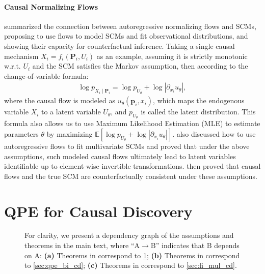 \documentclass{article}
\theoremstyle{plain}
\theoremstyle{definition}
\theoremstyle{remark}
\newcommand{\tikzbox}[2][black]{
    \tikz[baseline=-0.6ex]{
        \node[
            draw=#1,
            fill=#2,
            minimum size=1.5ex,
            inner sep=0pt,
        ] {};
    }%
}
\begin{document}
\paragraph{Causal Normalizing Flows}
\label{ssec:causal_flow}
\citet{Javaloy2023} summarized the connection between autoregressive normalizing flows and SCMs, proposing to use flows to model SCMs and fit observational distributions, and showing their capacity for counterfactual inference. Taking a single causal mechanism $X_i=f_i(\bm{P}_i,U_i)$ as an example, assuming it is strictly monotonic w.r.t. $U_i$ and the SCM satisfies the Markov assumption, then according to the change-of-variable formula:
\begin{align}
\label{eq:cov_cflow}
\log p_{X_i\mid\bm{P}_i}=\log p_{U_{\theta}}+\log |\partial_{x_i}u_\theta|,
\end{align}
where the causal flow is modeled as $u_\theta(\bm{p}_i,x_i)$, which maps the endogenous variable $X_i$ to a latent variable $U_\theta$, and $p_{U_{\theta}}$ is called the latent distribution. This formula also allows us to use Maximum Likelihood Estimation (MLE) to estimate parameters $\theta$ by maximizing $\mathbb{E}[\log p_{U_{\theta}}+\log|\partial_{x_i}u_\theta|]$. \citet{Javaloy2023} also discussed how to use autoregressive flows to fit multivariate SCMs and proved that under the above assumptions, such modeled causal flows ultimately lead to latent variables identifiable up to element-wise invertible transformations. \citet{Chen2025} then proved that causal flows and the true SCM are counterfactually consistent under these assumptions.%
\section{QPE for Causal Discovery}
\label{sec:qpe_cd}
\begin{figure}[t]
\begin{figure}[omitted: a diagram of this paper's results, not reproduced here]\end{figure}
\vspace*{-3mm}
\caption{For clarity, we present a dependency graph of the assumptions and theorems in the main text, where ``A$\rightarrow$B'' indicates that B depends on A: \textbf{(a)} Theorems in \protect\tikzbox[black]{darkgray!5} correspond to \cref{sec:qpe_cd}; \textbf{(b)} Theorems in \protect\tikzbox[black]{darkgray!20} correspond to \cref{sec:qpe_bi_cd}; \textbf{(c)} Theorems in \protect\tikzbox[black]{darkgray!40} correspond to \cref{sec:fi_mul_cd}.}
\label{fig:chain_theorem}
\end{figure}%
\end{document}
